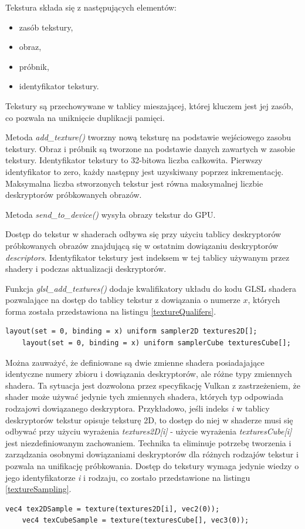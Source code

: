 Tekstura składa się z następujących elementów:
\begin{itemize}
	\item zasób tekstury,
	\item obraz,
	\item próbnik,
	\item identyfikator tekstury.
\end{itemize}
Tekstury są przechowywane w tablicy mieszającej, której kluczem jest jej zasób, co pozwala na uniknięcie duplikacji pamięci.

Metoda \textit{add\_texture()} tworzny nową teksturę na podstawie wejściowego zasobu tekstury.
Obraz i próbnik są tworzone na podstawie danych zawartych w zasobie tekstury.
Identyfikator tekstury to 32-bitowa liczba całkowita. Pierwszy identyfikator to zero, każdy następny jest uzyskiwany poprzez inkrementację. Maksymalna liczba stworzonych tekstur jest równa maksymalnej liczbie deskryptorów próbkowanych obrazów.

Metoda \textit{send\_to\_device()} wysyła obrazy tekstur do GPU. 

Dostęp do tekstur w shaderach odbywa się przy użyciu tablicy deskryptorów próbkowanych obrazów znajdującą się w ostatnim dowiązaniu deskryptorów \textit{descriptors}.
Identyfikator tekstury jest indeksem w tej tablicy używanym przez shadery i podczas aktualizacji deskryptorów.

Funkcja \textit{glsl\_add\_textures()} dodaje kwalifikatory układu do kodu GLSL shadera pozwalające na dostęp do tablicy tekstur z dowiązania o numerze $x$, których forma została przedstawiona na listingu \ref{textureQualifers}.
\lstset{language=GLSL}
\begin{lstlisting}[caption={Kwalifikatory układu dla tekstur \textit{textures}},captionpos=b,label={textureQualifers}]
	layout(set = 0, binding = x) uniform sampler2D textures2D[];
	layout(set = 0, binding = x) uniform samplerCube texturesCube[];
\end{lstlisting}
Można zauważyć, że definiowane są dwie zmienne shadera posiadajające identyczne numery zbioru i dowiązania deskryptorów, ale różne typy zmiennych shadera.
Ta sytuacja jest dozwolona przez specyfikację Vulkan z zastrzeżeniem, że shader może używać jedynie tych zmiennych shadera, których typ odpowiada rodzajowi dowiązanego deskryptora.
Przykładowo, jeśli indeks \textit{i} w tablicy deskryptorów tekstur opisuje teksturę 2D, to dostęp do niej w
shaderze musi się odbywać przy użyciu wyrażenia \textit{textures2D[i]} - użycie wyrażenia \textit{texturesCube[i]} jest niezdefiniowanym zachowaniem.
Technika ta eliminuje potrzebę tworzenia i zarządzania osobnymi dowiązaniami deskryptorów dla różnych rodzajów tekstur i pozwala na unifikację próbkowania. Dostęp do tekstury wymaga jedynie wiedzy o jego identyfikatorze \textit{i} i rodzaju, co zostało przedstawione na listingu \ref{textureSampling}.
\lstset{language=GLSL}
\begin{lstlisting}[caption={Przykład próbkowania tekstur},captionpos=b,label={textureSampling}]
	vec4 tex2DSample = texture(textures2D[i], vec2(0));
	vec4 texCubeSample = texture(texturesCube[], vec3(0));
\end{lstlisting}

